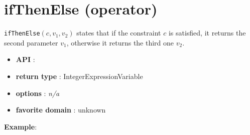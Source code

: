 
\section{ifThenElse (operator)}\label{ifthenelse:ifthenelseoperator}\hypertarget{ifthenelse:ifthenelseoperator}{}
\texttt{ifThenElse}$(c,v_1,v_2)$ states that if the constraint $c$ is satisfied, it returns the second parameter $v_1$, otherwise it returns the third one $v_2$.

\begin{itemize}
	\item \textbf{API} : 
	\item \textbf{return type} : IntegerExpressionVariable
	\item \textbf{options} : \emph{n/a}
	\item \textbf{favorite domain} : unknown
\end{itemize}

\textbf{Example}:
